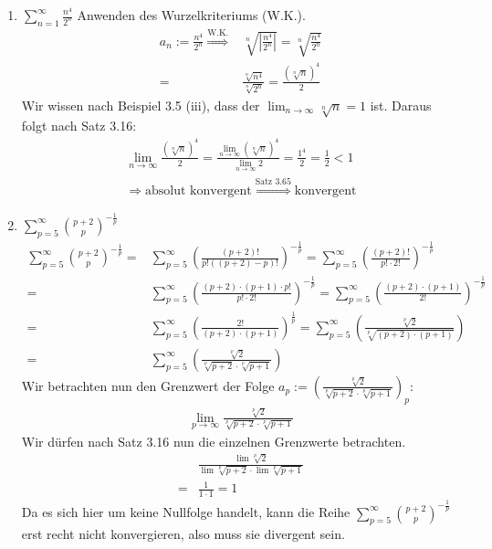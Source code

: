 \begin{lsg}
\begin{enumerate}[label=$\mathrm{(\roman*)}$, ref=$\mathrm{\roman*}$]
\item $\sum^{\infty}_{n=1}\frac{n^4}{2^n}$ Anwenden des Wurzelkriteriums (W.K.).
\begin{align*}
a_n:=\frac{n^4}{2^n} \overset{\text{W.K.}}{\Rightarrow} &\sqrt[n]{\left|\frac{n^4}{2^n}\right|} = \sqrt[n]{\frac{n^4}{2^n}} \\
= &\frac{\sqrt[n]{n^4}}{\sqrt[n]{2^n}} = \frac{(\sqrt[n]{n})^4}{2}
\end{align*}
Wir wissen nach Beispiel 3.5 (iii), dass der $\lim_{n \to \infty}\sqrt[n]{n} = 1$ ist. Daraus folgt nach Satz 3.16:
\begin{align*}
\lim_{n \to \infty} \frac{(\sqrt[n]{n})^4}{2} = \frac{\lim_{n \to \infty} (\sqrt[n]{n})^4}{\lim_{n \to \infty} 2} = \frac{1^4}{2} = \frac{1}{2} < 1 \\
\Rightarrow \text{absolut konvergent} \overset{\text{Satz 3.65}}{\Longrightarrow} \text{konvergent}
\end{align*}

\item $\sum^{\infty}_{p=5}\binom{p+2}{p}^{-\frac{1}{p}}$
\begin{align*}
\sum^{\infty}_{p=5}\binom{p+2}{p}^{-\frac{1}{p}} = &\sum^{\infty}_{p=5}\left(\frac{(p+2)!}{p!((p+2)-p)!}\right)^{-\frac{1}{p}} = \sum^{\infty}_{p=5}\left(\frac{(p+2)!}{p!\cdot 2!}\right)^{-\frac{1}{p}} \\
= &\sum^{\infty}_{p=5}\left(\frac{(p+2)\cdot (p+1) \cdot p!}{p!\cdot 2!}\right)^{-\frac{1}{p}} = \sum^{\infty}_{p=5}\left(\frac{(p+2)\cdot (p+1)}{2!}\right)^{-\frac{1}{p}} \\
= & \sum^{\infty}_{p=5}\left(\frac{2!}{(p+2)\cdot (p+1)}\right)^{\frac{1}{p}} = \sum^{\infty}_{p=5}\left(\frac{\sqrt[p]{2}}{\sqrt[p]{(p+2)\cdot (p+1)}}\right) \\
= & \sum^{\infty}_{p=5}\left(\frac{\sqrt[p]{2}}{\sqrt[p]{p+2}\cdot \sqrt[p]{p+1}}\right)
\end{align*}
Wir betrachten nun den Grenzwert der Folge $a_p:=\left(\frac{\sqrt[p]{2}}{\sqrt[p]{p+2}\cdot \sqrt[p]{p+1}}\right)_p$:
\begin{align*}
\lim_{p \to \infty}\frac{\sqrt[p]{2}}{\sqrt[p]{p+2}\cdot \sqrt[p]{p+1}}
\end{align*}
Wir dürfen nach Satz 3.16 nun die einzelnen Grenzwerte betrachten.
\begin{align*}
&\frac{\lim\sqrt[p]{2}}{\lim\sqrt[p]{p+2}\cdot \lim\sqrt[p]{p+1}} \\
= & \frac{1}{1\cdot 1} = 1
\end{align*}
Da es sich hier um keine Nullfolge handelt, kann die Reihe $\sum^{\infty}_{p=5}\binom{p+2}{p}^{-\frac{1}{p}}$ erst recht nicht konvergieren, also muss sie divergent sein.


\end{enumerate}
\end{lsg}
